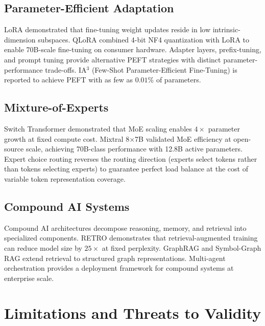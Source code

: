 \documentclass[10pt,journal,compsoc,twocolumn]{IEEEtran}
\begin{document}
\subsection{Parameter-Efficient Adaptation}


LoRA \cite{crossref_10_48550_arxiv_2106_09685} demonstrated that fine-tuning weight updates reside in low intrinsic-dimension subspaces. QLoRA \cite{crossref_10_48550_arxiv_2305_14314} combined 4-bit NF4 quantization with LoRA to enable 70B-scale fine-tuning on consumer hardware. Adapter layers, prefix-tuning, and prompt tuning provide alternative PEFT strategies with distinct parameter-performance trade-offs. IA$^3$ (Few-Shot Parameter-Efficient Fine-Tuning) is reported to achieve PEFT with as few as $0.01\%$ of parameters.


\subsection{Mixture-of-Experts}


Switch Transformer demonstrated that MoE scaling enables $4\times$ parameter growth at fixed compute cost. Mixtral 8$\times$7B validated MoE efficiency at open-source scale, achieving 70B-class performance with 12.8B active parameters. Expert choice routing reverses the routing direction (experts select tokens rather than tokens selecting experts) to guarantee perfect load balance at the cost of variable token representation coverage.


\subsection{Compound AI Systems}


Compound AI architectures \cite{arxiv_2406_00584} decompose reasoning, memory, and retrieval into specialized components. RETRO demonstrates that retrieval-augmented training can reduce model size by $25\times$ at fixed perplexity. GraphRAG \cite{arxiv_2501_14050} and Symbol-Graph RAG extend retrieval to structured graph representations. Multi-agent orchestration \cite{arxiv_2404_01131,crossref_10_1109_access_2026_3656309} provides a deployment framework for compound systems at enterprise scale.




\section{Limitations and Threats to Validity}
\end{document}
